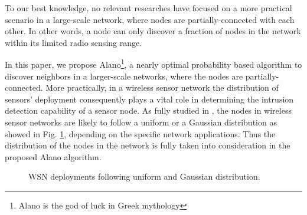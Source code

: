 To our best knowledge, no relevant researches have focused on a more 
practical scenario in a large-scale network, where nodes are partially-connected
with each other. In other words, a node can only discover a fraction of nodes in the
network within its limited radio sensing range.


In this paper, we propose Alano\footnote{Alano is the god of luck in Greek mythology }, 
a nearly optimal probability based algorithm to discover neighbors in a larger-scale networks,
where the nodes are partially-connected. 
More practically, in a wireless sensor network the distribution of 
sensors' deployment consequently plays a vital role in 
determining the intrusion detection capability of a sensor node.
As fully studied in \cite{wang2013gaussian} , the nodes in wireless sensor networks are likely to 
follow a uniform or a Gaussian distribution as showed in Fig. \ref{distribution}, 
depending on the specific network applications. 
Thus the distribution of the nodes in the network is fully taken into 
consideration in the proposed Alano algorithm.

 
 \begin{figure}[!t]
\centering
{}
\vspace{0.03in}
\caption{WSN deployments following uniform and Gaussian distribution.}
\label{distribution}
\end{figure}


